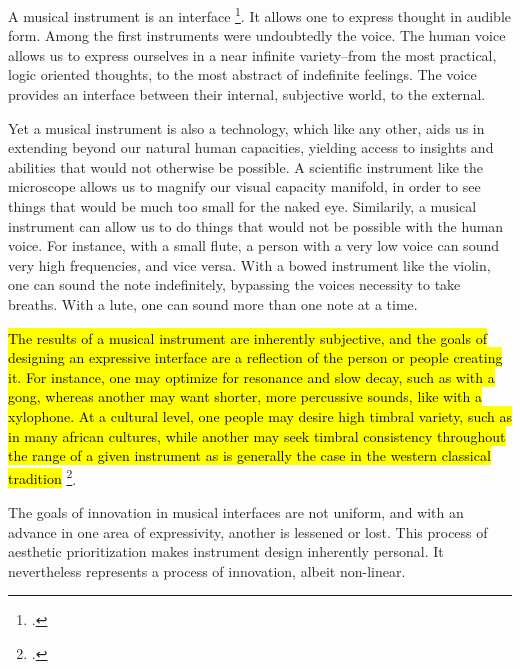 \documentclass[12pt,twoside,maitrise]{dms_ks}
\theoremstyle{definition}
\begin{document}
A musical instrument is an interface \footcite{noauthor_instrument_nodate}. 
It allows one to express thought in audible form. 
Among the first instruments were undoubtedly the voice. 
The human voice allows us to express ourselves in a near infinite variety--from the most practical, logic oriented thoughts, to the most abstract of indefinite feelings. 
The voice provides an interface between their internal, subjective world, to the external. 

Yet a musical instrument is also a technology, which like any other, aids us in extending beyond our natural human capacities, yielding access to insights and abilities that would not otherwise be possible. 
A scientific instrument like the microscope allows us to magnify our visual capacity manifold, in order to see things that would be much too small for the naked eye. 
Similarily, a musical instrument can allow us to do things that would not be possible with the human voice. 
For instance, with a small flute, a person with a very low voice can sound very high frequencies, and vice versa. 
With a bowed instrument like the violin, one can sound the note indefinitely, bypassing the voices necessity to take breaths. 
With a lute, one can sound more than one note at a time. 

\hl{The results of a musical instrument are inherently subjective, and the goals of designing an expressive interface are a reflection of the person or people creating it. 
For instance, one may optimize for resonance and slow decay, such as with a gong, whereas another may want shorter, more percussive sounds, like with a xylophone. 
At a cultural level, one people may desire high timbral variety, such as in many african cultures, while another may seek timbral consistency throughout the range of a given instrument as is generally the case in the western classical tradition} \footcite[69]{fales_fusion_1994}. 


The goals of innovation in musical interfaces are not uniform, and with an advance in one area of expressivity, another is lessened or lost. 
This process of aesthetic prioritization makes instrument design inherently personal. It nevertheless represents a process of innovation, albeit non-linear. 
\end{document}
